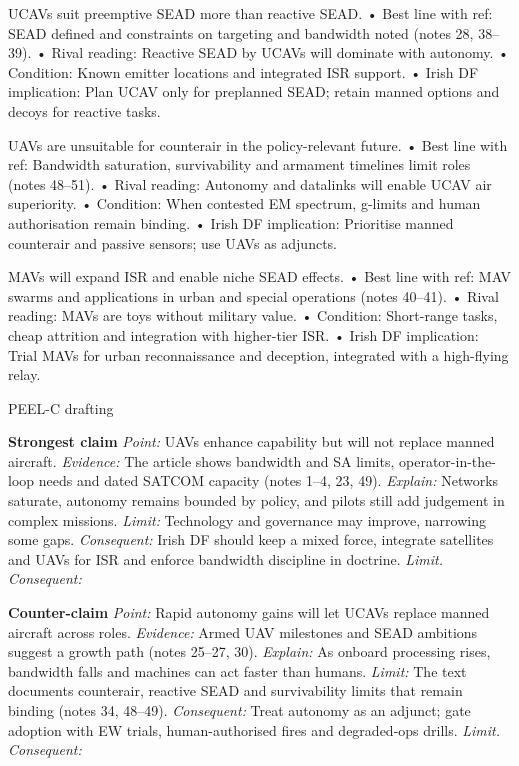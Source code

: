 UCAVs suit preemptive SEAD more than reactive SEAD.
• Best line with ref: SEAD defined and constraints on targeting and bandwidth noted (notes 28, 38–39).
• Rival reading: Reactive SEAD by UCAVs will dominate with autonomy.
• Condition: Known emitter locations and integrated ISR support.
• Irish DF implication: Plan UCAV only for preplanned SEAD; retain manned options and decoys for reactive tasks.

UAVs are unsuitable for counterair in the policy-relevant future.
• Best line with ref: Bandwidth saturation, survivability and armament timelines limit roles (notes 48–51).
• Rival reading: Autonomy and datalinks will enable UCAV air superiority.
• Condition: When contested EM spectrum, g-limits and human authorisation remain binding.
• Irish DF implication: Prioritise manned counterair and passive sensors; use UAVs as adjuncts.

MAVs will expand ISR and enable niche SEAD effects.
• Best line with ref: MAV swarms and applications in urban and special operations (notes 40–41).
• Rival reading: MAVs are toys without military value.
• Condition: Short-range tasks, cheap attrition and integration with higher-tier ISR.
• Irish DF implication: Trial MAVs for urban reconnaissance and deception, integrated with a high-flying relay.

PEEL-C drafting

\textbf{Strongest claim}
\textit{Point:} UAVs enhance capability but will not replace manned aircraft.
\textit{Evidence:} The article shows bandwidth and SA limits, operator-in-the-loop needs and dated SATCOM capacity (notes 1–4, 23, 49).
\textit{Explain:} Networks saturate, autonomy remains bounded by policy, and pilots still add judgement in complex missions.
\textit{Limit:} Technology and governance may improve, narrowing some gaps.
\textit{Consequent:} Irish DF should keep a mixed force, integrate satellites and UAVs for ISR and enforce bandwidth discipline in doctrine. \textit{Limit. Consequent:}

\textbf{Counter-claim}
\textit{Point:} Rapid autonomy gains will let UCAVs replace manned aircraft across roles.
\textit{Evidence:} Armed UAV milestones and SEAD ambitions suggest a growth path (notes 25–27, 30).
\textit{Explain:} As onboard processing rises, bandwidth falls and machines can act faster than humans.
\textit{Limit:} The text documents counterair, reactive SEAD and survivability limits that remain binding (notes 34, 48–49).
\textit{Consequent:} Treat autonomy as an adjunct; gate adoption with EW trials, human-authorised fires and degraded-ops drills. \textit{Limit. Consequent:}

